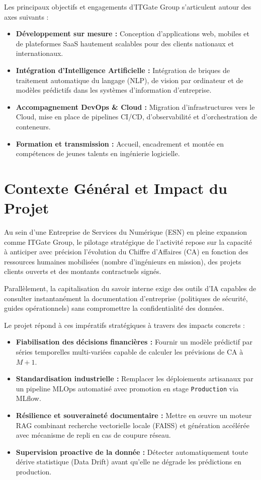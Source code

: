 \documentclass[11pt,a4paper,oneside]{report}
\begin{document}
Les principaux objectifs et engagements d'ITGate Group s'articulent autour des axes suivants :
\begin{itemize}[leftmargin=0.8cm, itemsep=3pt, topsep=1pt]
    \item \textbf{Développement sur mesure :} Conception d'applications web, mobiles et de plateformes SaaS hautement scalables pour des clients nationaux et internationaux.
    \item \textbf{Intégration d'Intelligence Artificielle :} Intégration de briques de traitement automatique du langage (NLP), de vision par ordinateur et de modèles prédictifs dans les systèmes d'information d'entreprise.
    \item \textbf{Accompagnement DevOps \& Cloud :} Migration d'infrastructures vers le Cloud, mise en place de pipelines CI/CD, d'observabilité et d'orchestration de conteneurs.
    \item \textbf{Formation et transmission :} Accueil, encadrement et montée en compétences de jeunes talents en ingénierie logicielle.
\end{itemize}

\section{Contexte Général et Impact du Projet}
Au sein d'une Entreprise de Services du Numérique (ESN) en pleine expansion comme ITGate Group, le pilotage stratégique de l'activité repose sur la capacité à anticiper avec précision l'évolution du Chiffre d'Affaires (CA) en fonction des ressources humaines mobilisées (nombre d'ingénieurs en mission), des projets clients ouverts et des montants contractuels signés.

Parallèlement, la capitalisation du savoir interne exige des outils d'IA capables de consulter instantanément la documentation d'entreprise (politiques de sécurité, guides opérationnels) sans compromettre la confidentialité des données.

Le projet répond à ces impératifs stratégiques à travers des impacts concrets :
\begin{itemize}[leftmargin=0.8cm, itemsep=3pt, topsep=1pt]
    \item \textbf{Fiabilisation des décisions financières :} Fournir un modèle prédictif par séries temporelles multi-variées capable de calculer les prévisions de CA à $M+1$.
    \item \textbf{Standardisation industrielle :} Remplacer les déploiements artisanaux par un pipeline MLOps automatisé avec promotion en stage \texttt{Production} via MLflow.
    \item \textbf{Résilience et souveraineté documentaire :} Mettre en œuvre un moteur RAG combinant recherche vectorielle locale (FAISS) et génération accélérée avec mécanisme de repli en cas de coupure réseau.
    \item \textbf{Supervision proactive de la donnée :} Détecter automatiquement toute dérive statistique (Data Drift) avant qu'elle ne dégrade les prédictions en production.
\end{itemize}
\end{document}
